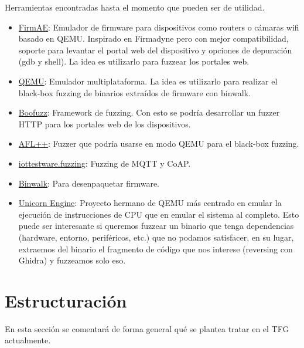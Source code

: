 \documentclass[11pt, a4paper, openany]{report}
\begin{document}
    Herramientas encontradas hasta el momento que pueden ser de utilidad.
    \begin{itemize}
        \item \href{https://github.com/pr0v3rbs/FirmAE}{FirmAE}: Emulador de firmware para dispositivos
        como routers o cámaras wifi basado en QEMU. Inspirado en Firmadyne pero con mejor compatibilidad, soporte
        para levantar el portal web del dispositivo y opciones de depuración (gdb y shell). La idea es
        utilizarlo para fuzzear los portales web.
        \item \href{https://www.qemu.org/}{QEMU}: Emulador multiplataforma. La idea es utilizarlo para 
        realizar el black-box fuzzing de binarios extraídos de firmware con binwalk.
        \item \href{https://github.com/jtpereyda/boofuzz}{Boofuzz}: Framework de fuzzing. Con esto se podría
        desarrollar un fuzzer HTTP para los portales web de los dispositivos.
        \item \href{https://github.com/AFLplusplus/AFLplusplus}{AFL++}: Fuzzer que podría usarse en 
        modo QEMU para el black-box fuzzing.
        \item \href{https://github.com/eclipse/iottestware.fuzzing}{iottestware.fuzzing}: Fuzzing de MQTT y CoAP.
        \item \href{https://github.com/ReFirmLabs/binwalk}{Binwalk}: Para desenpaquetar firmware.
        \item \href{https://github.com/unicorn-engine/unicorn}{Unicorn Engine}: Proyecto hermano de QEMU más centrado en
        emular la ejecución de instrucciones de CPU que en emular el sistema al completo. Esto puede ser interesante si
        queremos fuzzear un binario que tenga dependencias (hardware, entorno, periféricos, etc.) que no podamos
        satisfacer, en su lugar, extraemos del binario el fragmento de código que nos interese (reversing con Ghidra) y
        fuzzeamos solo eso. 
    \end{itemize}

    \section{Estructuración}
    En esta sección se comentará de forma general qué se plantea tratar en el TFG actualmente.
    
\end{document}
